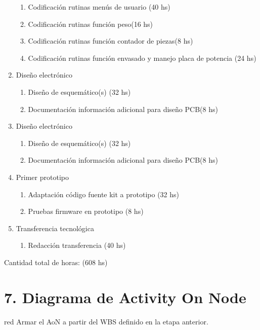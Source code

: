 \documentclass[11pt]{charter}
\begin{document}
\begin{enumerate}
\begin{enumerate}
	\item Codificación rutinas menús de usuario (40 hs)
	\item Codificación rutinas función peso(16 hs)
	\item Codificación rutinas función contador de piezas(8 hs)
	\item Codificación rutinas función envasado y manejo placa de potencia (24 hs)
	\end{enumerate}
\item Diseño electrónico
	\begin{enumerate}
	\item Diseño de esquemático(s) (32 hs)
	\item Documentación información adicional para diseño PCB(8 hs)
	\end{enumerate}	
\item Diseño electrónico
	\begin{enumerate}
	\item Diseño de esquemático(s) (32 hs)
	\item Documentación información adicional para diseño PCB(8 hs)
	\end{enumerate}	
\item Primer prototipo
	\begin{enumerate}
	\item Adaptación código fuente kit a prototipo (32 hs)
	\item Pruebas firmware en prototipo (8 hs)
	\end{enumerate}	
\item Transferencia tecnológica
	\begin{enumerate}
	\item Redacción transferencia (40 hs)
	\end{enumerate}					
\end{enumerate}

Cantidad total de horas: (608 hs)




\section{7. Diagrama de Activity On Node}
\label{sec:AoN}

\begin{consigna}{red}
Armar el AoN a partir del WBS definido en la etapa anterior. 



\end{consigna}
\end{document}
